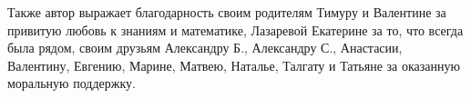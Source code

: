 Также автор выражает благодарность своим родителям Тимуру и Валентине за привитую любовь к знаниям и математике, Лазаревой Екатерине за то, что всегда была рядом, своим друзьям Александру Б., Александру С., Анастасии, Валентину, Евгению, Марине, Матвею, Наталье, Талгату и Татьяне за оказанную моральную поддержку.